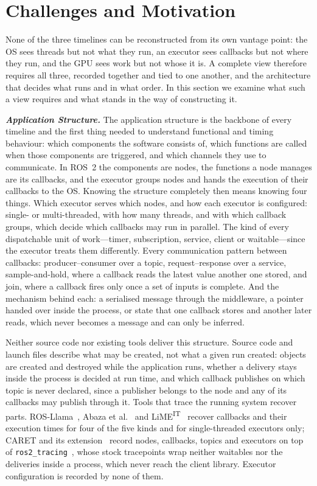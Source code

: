 \section{Challenges and Motivation}
\label{sec:goal}
None of the three timelines can be reconstructed from its own vantage point: the OS sees threads but not what they run, an executor sees callbacks but not where they run, and the GPU sees work but not whose it is. A complete view therefore requires all three, recorded together and tied to one another, and the architecture that decides what runs and in what order. In this section we examine what such a view requires and what stands in the way of constructing it.

\noindent
\textit{\textbf{Application Structure.}}
The application structure is the backbone of every timeline and the first thing needed to understand functional and timing behaviour: which components the software consists of, which functions are called when those components are triggered, and which channels they use to communicate. In ROS~2 the components are nodes, the functions a node manages are its callbacks, and the executor groups nodes and hands the execution of their callbacks to the OS. Knowing the structure completely then means knowing four things. Which executor serves which nodes, and how each executor is configured: single- or multi-threaded, with how many threads, and with which callback groups, which decide which callbacks may run in parallel. The kind of every dispatchable unit of work---timer, subscription, service, client or waitable---since the executor treats them differently. Every communication pattern between callbacks: producer--consumer over a topic, request--response over a service, sample-and-hold, where a callback reads the latest value another one stored, and join, where a callback fires only once a set of inputs is complete. And the mechanism behind each: a serialised message through the middleware, a pointer handed over inside the process, or state that one callback stores and another later reads, which never becomes a message and can only be inferred.

Neither source code nor existing tools deliver this structure. Source code and launch files describe what may be created, not what a given run created: objects are created and destroyed while the application runs, whether a delivery stays inside the process is decided at run time, and which callback publishes on which topic is never declared, since a publisher belongs to the node and any of its callbacks may publish through it. Tools that trace the running system recover parts. ROS-Llama~\cite{blass-2021-rosllama-paper}, Abaza et al.~\cite{abaza-2024-ros2modelsynthesis} and LiME\textsuperscript{IT}~\cite{brandenburg-2026-limeit} recover callbacks and their execution times for four of the five kinds and for single-threaded executors only; CARET and its extension~\cite{kuboichi-2022-caret,peng-2022-caretcomp} record nodes, callbacks, topics and executors on top of \texttt{ros2\_tracing}~\cite{bedard-2022-ros2tracing}, whose stock tracepoints wrap neither waitables nor the deliveries inside a process, which never reach the client library. Executor configuration is recorded by none of them.

